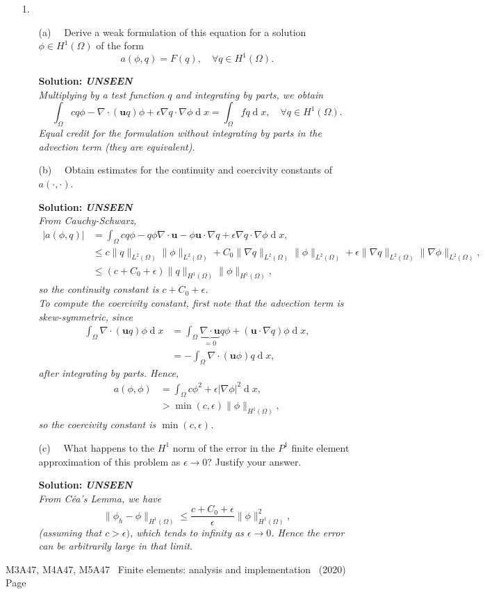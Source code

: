 \documentclass[12pt]{article}
\newcommand{\coursenum}{M3A47, M4A47, M5A47} %
\newcommand{\coursename}{Finite elements: analysis and implementation} %
\newcommand{\unseen}{{\bfseries UNSEEN\\}}
\newcommand{\exammarks}[1]{\begin{flushright}[#1 marks]\end{flushright}}%
\def\MM#1{\boldsymbol{#1}}
\DeclareMathOperator{\diff}{d}
\newcommand{\soln}[1]{{\bfseries Solution:} {\itshape \color{blue} #1}}
\newcommand{\soln}[1]{}
\newcommand{\examyear}{2020}
\newenvironment{Question}[1] 
 {\begin{itemize} \item[\large #1.~~]}{\end{itemize} \medskip}
\newcommand{\EndPage}{
	\vfill \coursenum ~ \coursename ~
	(\examyear) \hfill Page \thepage \newpage
	}
\newcommand{\BeginParts}{\begin{itemize}}
\newcommand{\Part}[1]{\item [(#1)~~]}
\newcommand{\EndParts}{\end{itemize}}
\begin{document}
\begin{Question}{1}
\BeginParts
\Part{a} Derive a weak formulation of this equation for a solution
$\phi\in H^1(\Omega)$ of the form
\begin{equation}
  a(\phi,q) = F(q), \quad \forall q \in H^1(\Omega).
\end{equation}
\exammarks{5}
\soln{\unseen
  Multiplying by a test function $q$ and integrating by parts, we obtain
  \[
  \int_{\Omega} cq\phi -\nabla\cdot (\MM{u}q)\phi + \epsilon \nabla q\cdot\nabla\phi
  \diff x = \int_{\Omega} fq\diff x, \quad \forall q\in H^1(\Omega).
  \]
  Equal credit for the formulation without integrating by parts in the
  advection term (they are equivalent).
}
\Part{b} Obtain estimates for the continuity and coercivity constants
of $a(\cdot,\cdot)$.
\exammarks{10}
\soln{\unseen
  From Cauchy-Schwarz, 
  \begin{align*}
    |a(\phi,q)| & = \int_{\Omega} cq\phi -q\phi\nabla\cdot\MM{u} - \phi\MM{u}\cdot
    \nabla q + \epsilon \nabla q \cdot \nabla \phi \diff x, \\
    & \leq c\|q\|_{L^2(\Omega)}\|\phi\|_{L^2(\Omega)}
    + C_0\|\nabla q\|_{L^2(\Omega)}\|\phi\|_{L^2(\Omega)}
    + \epsilon \|\nabla q \|_{L^2(\Omega)}\|\nabla \phi\|_{L^2(\Omega)}, \\
    & \leq \left(c + C_0 + \epsilon\right)\|q\|_{H^1(\Omega)}
    \|\phi\|_{H^1(\Omega)}, 
  \end{align*}
  so the continuity constant is $c + C_0  + \epsilon$.\\
  To compute the coercivity constant, first note that the advection term
  is skew-symmetric, since
  \begin{align*}
    \int_{\Omega} \nabla\cdot (\MM{u}q)\phi \diff x & =
    \int_{\Omega} \underbrace{\nabla\cdot \MM{u}}_{=0} q\phi
    + (\MM{u}\cdot\nabla q) \phi\diff x, \\
    & = -\int_{\Omega} \nabla\cdot(\MM{u}\phi) q \diff x,
  \end{align*}
  after integrating by parts. Hence,
  \begin{align*}
    a(\phi,\phi) & = \int_{\Omega} c\phi^2 + \epsilon|\nabla \phi|^2
    \diff x, \\
    & > \min(c,\epsilon) \|\phi\|_{H^1(\Omega)},
  \end{align*}
  so the coercivity constant is $\min(c,\epsilon)$.
}
\Part{c} What happens to the $H^1$ norm of the error in the $P^1$ finite element approximation
of this problem as $\epsilon \to 0$? Justify your answer.
\exammarks{5}
\soln{\unseen From C\'ea's Lemma, we have
  \[
  \|\phi_h - \phi\|_{H^1(\Omega)} \leq
  \frac{c + C_0+\epsilon}{\epsilon}
  \|\phi\|^2_{H^1(\Omega)},
  \]
  (assuming that $c>\epsilon)$, which tends to infinity as $\epsilon
  \to 0$. Hence the error can be arbitrarily large in that limit.}
\EndParts
\end{Question}
\EndPage
\end{document}
